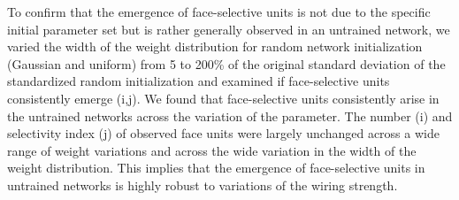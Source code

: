 \documentclass[final,3p,times,twocolumn]{elsarticle}
\begin{document}
To confirm that the emergence of face-selective units is not due to the specific initial parameter set but is rather generally observed in an untrained network,
we varied the width of the weight distribution for random network initialization (Gaussian and uniform) from 5 to 200\% of the original standard deviation of the standardized random initialization and examined if face-selective units consistently emerge (i,j).
We found that face-selective units consistently arise in the untrained networks across the variation of the parameter.
The number (i) and selectivity index (j) of observed face units were largely unchanged across a wide range of weight variations and across the wide variation in the width of the weight distribution.
This implies that the emergence of face-selective units in untrained networks is highly robust to variations of the wiring strength.
\end{document}
